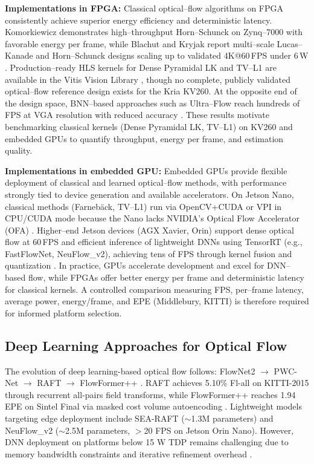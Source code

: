 \documentclass[conference]{IEEEtran}
\begin{document}
\textbf{Implementations in FPGA:}
Classical optical–flow algorithms on FPGA consistently achieve superior energy efficiency and deterministic latency. Komorkiewicz \cite{ref1} demonstrates high–throughput Horn–Schunck on Zynq–7000 with favorable energy per frame, while Blachut and Kryjak \cite{ref13} report multi–scale Lucas–Kanade and Horn–Schunck designs scaling up to validated 4K@60\,FPS under 6\,W \cite{ref13}. Production–ready HLS kernels for Dense Pyramidal LK and TV–L1 are available in the Vitis Vision Library \cite{ref6,ref17}, though no complete, publicly validated optical–flow reference design exists for the Kria KV260. At the opposite end of the design space, BNN–based approaches such as Ultra–Flow reach hundreds of FPS at VGA resolution with reduced accuracy \cite{ref16}. These results motivate benchmarking classical kernels (Dense Pyramidal LK, TV–L1) on KV260 and embedded GPUs to quantify throughput, energy per frame, and estimation quality.

\textbf{Implementations in embedded GPU:}
Embedded GPUs provide flexible deployment of classical and learned optical–flow methods, with performance strongly tied to device generation and available accelerators. On Jetson Nano, classical methods (Farnebäck, TV–L1) run via OpenCV+CUDA or VPI in CPU/CUDA mode because the Nano lacks NVIDIA's Optical Flow Accelerator (OFA) \cite{ref20,ref24}. Higher–end Jetson devices (AGX Xavier, Orin) support dense optical flow at 60\,FPS and efficient inference of lightweight DNNs using TensorRT (e.g., FastFlowNet, NeuFlow\_v2), achieving tens of FPS through kernel fusion and quantization \cite{ref25,ref27,ref28}. In practice, GPUs accelerate development and excel for DNN–based flow, while FPGAs offer better energy per frame and deterministic latency for classical kernels. A controlled comparison measuring FPS, per–frame latency, average power, energy/frame, and EPE (Middlebury, KITTI) is therefore required for informed platform selection.

\subsection{Deep Learning Approaches for Optical Flow}

The evolution of deep learning-based optical flow follows: FlowNet2 \cite{ref2} $\rightarrow$ PWC-Net \cite{ref8} $\rightarrow$ RAFT \cite{ref7} $\rightarrow$ FlowFormer++ \cite{ref10}. RAFT achieves 5.10\% Fl-all on KITTI-2015 through recurrent all-pairs field transforms, while FlowFormer++ reaches 1.94 EPE on Sintel Final via masked cost volume autoencoding \cite{ref10}. Lightweight models targeting edge deployment include SEA-RAFT \cite{ref11} ($\sim$1.3M parameters) and NeuFlow\_v2 \cite{ref3} ($\sim$2.5M parameters, $>$20 FPS on Jetson Orin Nano). However, DNN deployment on platforms below 15 W TDP remains challenging due to memory bandwidth constraints and iterative refinement overhead \cite{ref3,ref11}.
\end{document}
